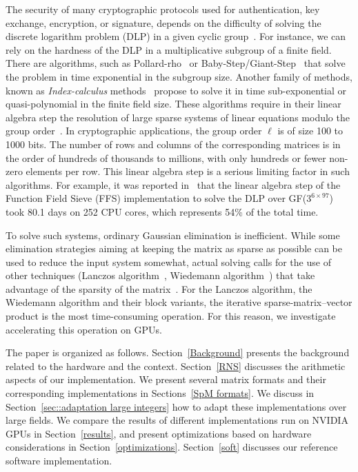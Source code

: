 \documentclass[runningheads,orivec]{llncs}
\begin{document}
The security of many cryptographic protocols used for authentication, key exchange, encryption, or signature, depends on the difficulty of solving the discrete logarithm problem (DLP) in a given cyclic group~\cite{ODLY84}. For instance, we can rely on the hardness of the DLP in a multiplicative subgroup of a finite field. There are algorithms, such as Pollard-rho~\cite{POLL75} or Baby-Step/Giant-Step~\cite{SHAN71} that solve the problem in time exponential in the subgroup size. Another family of methods, known as \textit{Index-calculus} methods~\cite{ADLE79} propose to solve it in time sub-exponential or quasi-polynomial in the finite field size. These algorithms require in their linear algebra step the resolution of large sparse systems of linear equations modulo the group order~\cite{LAMA90}. In cryptographic applications, the group order $\ell$ is of size 100 to 1000 bits. The number of rows and columns of the corresponding matrices is in the order of hundreds of thousands to millions, with only hundreds or fewer non-zero elements per row. This linear algebra step is a serious limiting factor in such algorithms. For example, it was reported in~\cite{HAYA12} that the linear algebra step of the Function Field Sieve (FFS) implementation to solve the DLP over GF($3^{6\times97}$) took 80.1 days on 252 CPU cores, which represents 54\% of the total time.
 
To solve such systems, ordinary Gaussian elimination is inefficient. While some elimination strategies aiming at keeping the matrix as sparse as possible can be used to reduce the input system somewhat, actual solving calls for the use of other techniques (Lanczos algorithm~\cite{LANC52}, Wiedemann algorithm~\cite{WIED86}) that take advantage of the sparsity of the matrix~\cite{POME92}. For the Lanczos algorithm, the Wiedemann algorithm and their block variants, the iterative sparse-matrix--vector product is the most time-consuming operation. For this reason, we investigate accelerating this operation on GPUs.

The paper is organized as follows. Section~\ref{Background} presents the background related to the hardware and the context. Section~\ref{RNS} discusses the arithmetic aspects of our implementation. We present several matrix formats and their corresponding implementations in Sections~\ref{SpM formats}. We discuss in Section~\ref{sec::adaptation large integers} how to adapt these implementations over large fields. We compare the results of different implementations run on NVIDIA GPUs in Section~\ref{results}, and present optimizations based on hardware considerations in Section~\ref{optimizations}. Section~\ref{soft} discusses our reference software implementation.  
 
\end{document}
